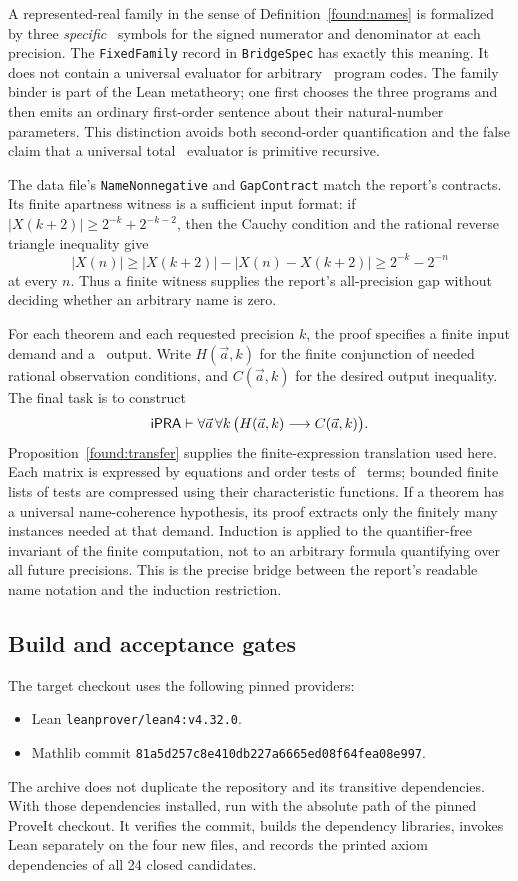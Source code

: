 A represented-real family in the sense of Definition~\ref{found:names} is
formalized by three \emph{specific} \PR\ symbols
for the signed numerator and denominator at each precision.  The
\texttt{FixedFamily} record in \texttt{BridgeSpec} has exactly this meaning.
It does not contain a universal evaluator for arbitrary \PR\ program codes.
The family binder is part of the Lean metatheory; one first chooses the three
programs and then emits an ordinary first-order sentence about their
natural-number parameters.  This distinction avoids both second-order
quantification and the false claim that a universal total \PR\ evaluator is
primitive recursive.

The data file's \texttt{NameNonnegative} and \texttt{GapContract} match the
report's contracts.  Its finite apartness witness is a sufficient input format:
if $|X(k+2)|\ge2^{-k}+2^{-k-2}$, then the Cauchy condition and the rational
reverse triangle inequality give
\[
 |X(n)|\ge |X(k+2)|-|X(n)-X(k+2)|
       \ge2^{-k}-2^{-n}
\]
at every $n$.  Thus a finite witness supplies the report's all-precision gap
without deciding whether an arbitrary name is zero.

For each theorem and each requested precision $k$, the proof specifies a finite
input demand and a \PR\ output.  Write $H(\vec a,k)$ for the finite conjunction
of needed rational observation conditions, and $C(\vec a,k)$ for the desired
output inequality.  The final task is to construct
\[
 \mathsf{iPRA}\vdash\forall\vec a\,\forall k\,
       \bigl(H(\vec a,k)\longrightarrow C(\vec a,k)\bigr).
\]
Proposition~\ref{found:transfer} supplies the finite-expression translation used
here.  Each matrix is expressed by equations and order tests of \PR\ terms; bounded
finite lists of tests are compressed using their characteristic functions.
If a theorem has a universal name-coherence hypothesis, its proof extracts only
the finitely many instances needed at that demand.  Induction is applied to the
quantifier-free invariant of the finite computation, not to an arbitrary
formula quantifying over all future precisions.  This is the precise bridge
between the report's readable name notation and the induction restriction.

\subsection{Build and acceptance gates}

The target checkout uses the following pinned providers:
\begin{itemize}
\item Lean \texttt{leanprover/lean4:v4.32.0}.
\item Mathlib commit \texttt{81a5d257c8e410db227a6665ed08f64fea08e997}.
\end{itemize}
The archive does not duplicate
the repository and its transitive dependencies.  With those dependencies
installed, run  with the absolute path of the
pinned ProveIt checkout.  It verifies the commit, builds the dependency
libraries, invokes Lean separately on the four new files, and records the
printed axiom dependencies of all 24 closed candidates.

